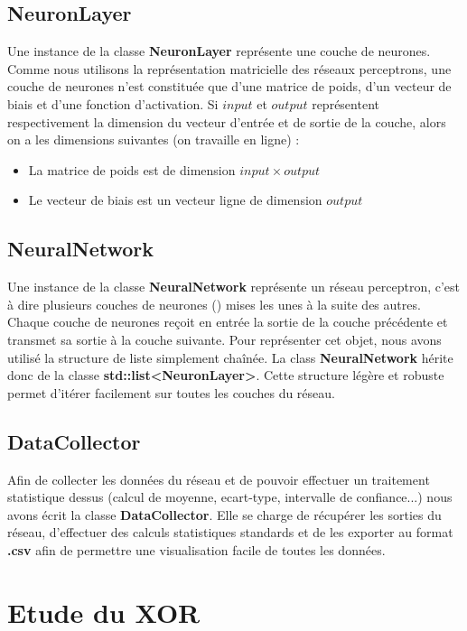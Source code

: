 \subsection{NeuronLayer}

Une instance de la classe \textbf{NeuronLayer} représente une couche de neurones. Comme nous utilisons la représentation matricielle des réseaux perceptrons, une couche de neurones n'est constituée que d'une matrice de poids, d'un vecteur de biais et d'une fonction d'activation. Si $input$ et $output$ représentent respectivement la dimension du vecteur d'entrée et de sortie de la couche, alors on a les dimensions suivantes (on travaille en ligne) :
\begin{itemize}
	\item La matrice de poids est de dimension $input \times output$
	\item Le vecteur de biais est un vecteur ligne de dimension $output$
\end{itemize}

\subsection{NeuralNetwork}

Une instance de la classe \textbf{NeuralNetwork} représente un réseau perceptron, c'est à dire plusieurs couches de neurones () mises les unes à la suite des autres. Chaque couche de neurones reçoit en entrée la sortie de la couche précédente et transmet sa sortie à la couche suivante. 
Pour représenter cet objet, nous avons utilisé la structure de liste simplement chaînée. La class \textbf{NeuralNetwork} hérite donc de la classe \textbf{std::list<NeuronLayer>}. Cette structure légère et robuste permet d'itérer facilement sur toutes les couches du réseau. 

\subsection{DataCollector}

Afin de collecter les données du réseau et de pouvoir effectuer un traitement statistique dessus (calcul de moyenne, ecart-type, intervalle de confiance...) nous avons écrit la classe \textbf{DataCollector}. Elle se charge de récupérer les sorties du réseau, d'effectuer des calculs statistiques standards et de les exporter au format \textbf{.csv} afin de permettre une visualisation facile de toutes les données.

\section{Etude du XOR}

